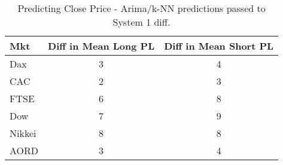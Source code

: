 \begin{table}[ht]
\centering
\caption[Predicting Close Price - Arima/k-NN predictions passed to System 1.]{Predicting Close Price - Arima/k-NN predictions passed to System 1 diff.} 
\label{tab:chp_ts:pred_close_arima_knn_sys1_diff}
\begin{tabular}{lcc}
  \toprule Mkt & Diff in Mean Long PL & Diff in Mean Short PL \\ 
  \midrule Dax & 3 & 4 \\ 
  CAC & 2 & 3 \\ 
  FTSE & 6 & 8 \\ 
  Dow & 7 & 9 \\ 
  Nikkei & 8 & 8 \\ 
  AORD & 3 & 4 \\ 
   \bottomrule \end{tabular}
\end{table}
